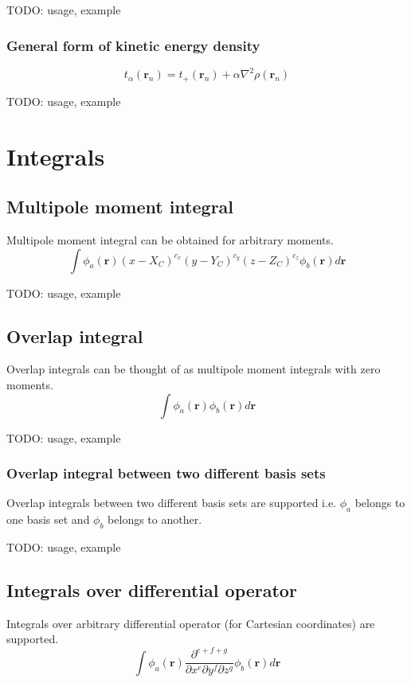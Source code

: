 \documentclass[letterpaper]{article}
\begin{document}
TODO: usage, example
\subsubsection{General form of kinetic energy density}
\begin{equation}
  t_{\alpha} (\mathbf{r}_n) = t_+(\mathbf{r}_n) + \alpha \nabla^2 \rho(\mathbf{r}_n)
\end{equation}

TODO: usage, example
\section{Integrals}
\subsection{Multipole moment integral}
Multipole moment integral can be obtained for arbitrary moments.
\begin{equation}
  \label{eq:multipole}
  \int \phi_a (\mathbf{r}) (x - X_C)^{c_x} (y - Y_C)^{c_y} (z - Z_C)^{c_z} \phi_b (\mathbf{r}) d\mathbf{r}
\end{equation}

TODO: usage, example
\subsection{Overlap integral}
Overlap integrals can be thought of as multipole moment integrals with zero moments.
\begin{equation}
  \label{eq:overlap}
  \int \phi_a (\mathbf{r}) \phi_b (\mathbf{r}) d\mathbf{r}
\end{equation}

TODO: usage, example
\subsubsection{Overlap integral between two different basis sets}
Overlap integrals between two different basis sets are supported i.e.
$\phi_a$ belongs to one basis set and $\phi_b$ belongs to another.

TODO: usage, example
\subsection{Integrals over differential operator}
Integrals over arbitrary differential operator (for Cartesian coordinates) are
supported.
\begin{equation}
  \int
  \phi_a(\mathbf{r}) \frac{\partial^{e+f+g}}{\partial x^e \partial y^f \partial z^g} \phi_b(\mathbf{r})
  d\mathbf{r}
\end{equation}
\end{document}
